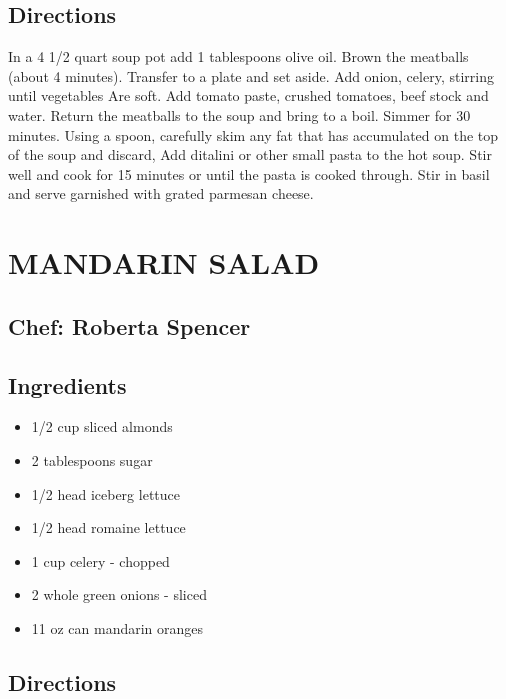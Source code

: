 \documentclass[
]{book}
\providecommand{\tightlist}{%
  \setlength{\itemsep}{0pt}\setlength{\parskip}{0pt}}
\begin{document}
\hypertarget{directions-19}{%
\subsection*{Directions}\label{directions-19}}


In a 4 1/2 quart soup pot add 1 tablespoons olive oil. Brown the meatballs
(about 4 minutes). Transfer to a plate and set aside. Add onion, celery, stirring until vegetables
Are soft. Add tomato paste, crushed tomatoes, beef stock and water.
Return the meatballs to the soup and bring to a boil. Simmer for 30 minutes.
Using a spoon, carefully skim any fat that has accumulated on the top of the soup and discard,
Add ditalini or other small pasta to the hot soup.
Stir well and cook for 15 minutes or until the pasta is cooked through.
Stir in basil and serve garnished with grated parmesan cheese.

\hypertarget{mandarin-salad}{%
\section*{MANDARIN SALAD}\label{mandarin-salad}}


\hypertarget{chef-roberta-spencer-3}{%
\subsection*{Chef: Roberta Spencer}\label{chef-roberta-spencer-3}}


\hypertarget{ingredients-20}{%
\subsection*{Ingredients}\label{ingredients-20}}


\begin{itemize}
\tightlist
\item
  1/2 cup sliced almonds
\item
  2 tablespoons sugar
\item
  1/2 head iceberg lettuce
\item
  1/2 head romaine lettuce
\item
  1 cup celery - chopped
\item
  2 whole green onions - sliced
\item
  11 oz can mandarin oranges
\end{itemize}

\hypertarget{directions-20}{%
\subsection*{Directions}\label{directions-20}}
\end{document}
